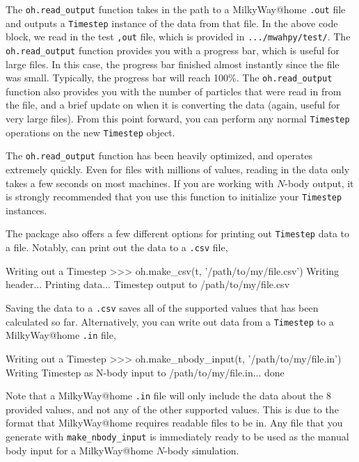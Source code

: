 \documentclass{article}
\begin{document}
The \verb!oh.read_output! function takes in the path to a MilkyWay@home \verb!.out! file and outputs a \verb!Timestep! instance of the data from that file. In the above code block, we read in the test \verb!,out! file, which is provided in \verb!.../mwahpy/test/!. The \verb!oh.read_output! function provides you with a progress bar, which is useful for large files. In this case, the progress bar finished almost instantly since the file was small. Typically, the progress bar will reach 100\%. The \verb!oh.read_output! function also provides you with the number of particles that were read in from the file, and a brief update on when it is converting the data (again, useful for very large files). From this point forward, you can perform any normal \verb!Timestep! operations on the new \verb!Timestep! object. 

The \verb!oh.read_output! function has been heavily optimized, and operates extremely quickly. Even for files with millions of values, reading in the data only takes a few seconds on most machines. If you are working with $N$-body output, it is strongly recommended that you use this function to initialize your \verb!Timestep! instances.

The \mwahpy package also offers a few different options for printing out \verb!Timestep! data to a file. Notably, \mwahpy can print out the data to a \verb!.csv! file, \\

\begin{codelisting}{Writing out a Timestep}
>>> oh.make_csv(t, '/path/to/my/file.csv')
Writing header...
Printing data...
Timestep output to /path/to/my/file.csv
\end{codelisting}

Saving the data to a \verb!.csv! saves all of the supported values that has been calculated so far. Alternatively, you can write out data from a \verb!Timestep! to a MilkyWay@home \verb!.in! file, \\

\begin{codelisting}{Writing out a Timestep}
>>> oh.make_nbody_input(t, '/path/to/my/file.in')
Writing Timestep as N-body input to /path/to/my/file.in...
done
\end{codelisting}

Note that a MilkyWay@home \verb!.in! file will only include the data about the 8 provided values, and not any of the other supported values. This is due to the format that MilkyWay@home requires readable files to be in. Any file that you generate with \verb!make_nbody_input! is immediately ready to be used as the manual body input for a MilkyWay@home $N$-body simulation.
\end{document}
